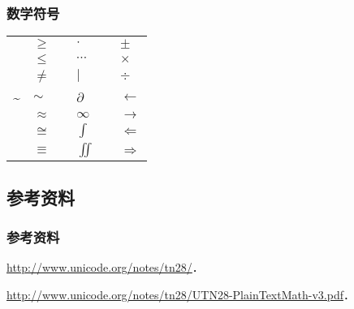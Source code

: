 \documentclass[12pt,notheorems,xcolor={rgb}]{beamer}
\def\bold#1{\textcolor{accent2}{#1}}
\def\warn#1{\textcolor{accent3}{#1}}
\newcommand{\mcmd}[1]{\bold{\string#1}&\warn{$#1$}}
\begin{document}
\begin{frame}
\frametitle{数学符号}
\renewcommand{\arraystretch}{1.2}%
\begin{tabu}{|*{3}{Xl|}}
  \hline
  \mcmd{\ge}     &  \mcmd{\cdot}    & \mcmd{\pm}         \\
  \mcmd{\le}     &  \mcmd{\cdots}   & \mcmd{\times}      \\
  \mcmd{\neq}    &  \mcmd{\mid}     & \mcmd{\div}        \\
  \mcmd{\sim}    &  \mcmd{\partial} & \mcmd{\leftarrow}  \\
  \mcmd{\approx} &  \mcmd{\infty}   & \mcmd{\rightarrow} \\
  \mcmd{\cong}   &  \mcmd{\int}     & \mcmd{\Leftarrow}  \\
  \mcmd{\equiv}  &  \mcmd{\iint}    & \mcmd{\Rightarrow} \\
  \hline
\end{tabu}
\end{frame}

\subsection{参考资料}

\begin{frame}
\frametitle{参考资料}
\begin{description}[一二三四]
  \item[网页说明] \href{http://www.unicode.org/notes/tn28/}{http://www.unicode.org/notes/tn28/}．
  \item[详细文档] \href{http://www.unicode.org/notes/tn28/UTN28-PlainTextMath-v3.pdf}
                      {http://www.unicode.org/notes/tn28/\newline UTN28-PlainTextMath-v3.pdf}．
\end{description}
\end{frame}
\end{document}
